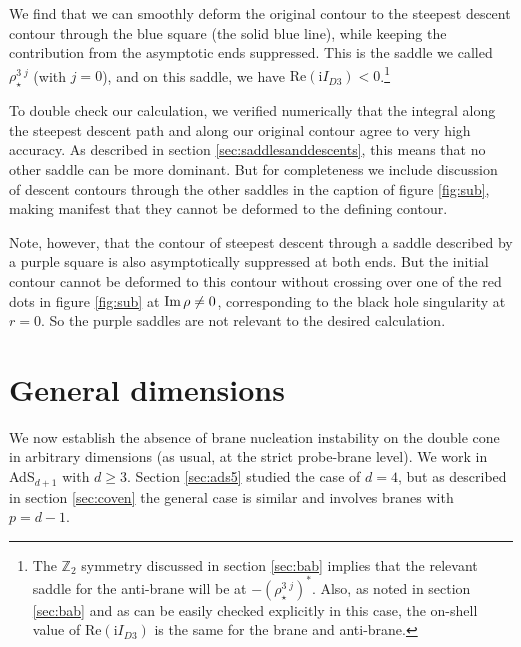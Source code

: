 \documentclass[11pt]{article}
\renewcommand{\i}{\mathrm{i}}
\begin{document}
We find that we can smoothly deform the original contour to the steepest descent contour through the blue square (the solid blue line), while keeping the contribution from the asymptotic ends suppressed.
This is the saddle we called $\rho^{3\;j}_\star$ (with $j=0$), and on this saddle, we have $\text{Re}(\i I_{D3}) < 0$.\footnote{The $\mathbb{Z}_2$ symmetry discussed in section \ref{sec:bab} implies that the relevant saddle for the anti-brane will be at $-(\rho^{3\;j}_\star)^*$.
Also, as noted in section \ref{sec:bab} and as can be easily checked explicitly in this case, the on-shell value of $\text{Re}\left(\i I_{D3}\right)$ is the same for the brane and anti-brane.}

To double check our calculation, we verified numerically that the integral along the steepest descent path and along our original contour agree to very high accuracy. As described in section \ref{sec:saddlesanddescents}, this means that no other saddle can be more dominant.
But for completeness we include discussion of descent contours through the other saddles in the caption of figure \ref{fig:sub}, making manifest that they cannot be deformed to the defining contour.

Note, however, that the contour of steepest descent through a saddle described by a purple square is also asymptotically suppressed at both ends. 
But the initial contour cannot be deformed to this contour without crossing over one of the red dots in figure \ref{fig:sub} at ${\rm Im} \, \rho \neq 0$, corresponding to the black hole singularity at $r=0$. 
So the purple saddles are not relevant to the desired calculation.



\section{General dimensions\label{sec:gend}}
We now establish the absence of brane nucleation instability on the double cone in arbitrary dimensions (as usual, at the strict probe-brane level).
We work in AdS$_{d+1}$ with $d\geq 3$.
Section \ref{sec:ads5} studied the case of $d=4$, but as described in section \ref{sec:coven} the general case is similar and involves branes with $p=d-1$.
\end{document}
